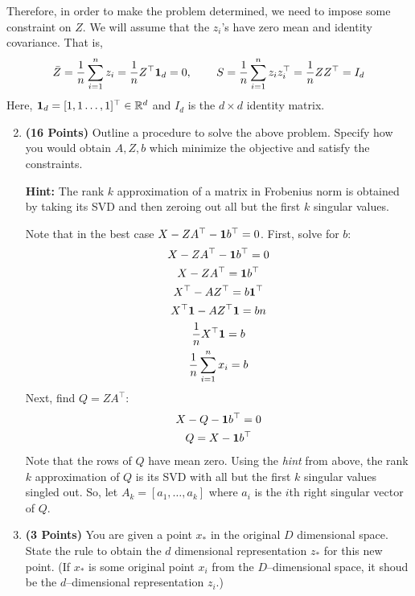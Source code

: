 Therefore, in order to make the problem determined, we need to impose some
constraint on $Z$. We will assume that the $z_i$'s have zero mean and identity covariance.
That is,
\begin{align*}
\bar{Z} = \frac{1}{n} \sum_{i=1}^n z_i =\frac{1}{n} Z^\top {\bf 1}_d = 0, \hspace{0.3in} 
S = \frac{1}{n} \sum_{i=1}^n z_i z_i^\top 
= \frac{1}{n} Z Z^\top
= I_d
\end{align*}
Here, ${\bf 1}_d = [1, 1 \dots, 1]^\top \in\mathbb{R}^d$ and $I_d$  is the $d\times d$ identity matrix.

\begin{enumerate}
\setcounter{enumi}{1}
\item \textbf{(16 Points)}
Outline a procedure to solve the above problem. Specify how you
would obtain $A, Z, b$ which minimize the objective and satisfy the constraints.

\textbf{Hint: }The rank $k$ approximation of a matrix in Frobenius norm is obtained by
taking its SVD and then zeroing out all but the first $k$ singular values.

\begin{soln}
  Note that in the best case $X - ZA^\top - {\bf 1} b^\top = 0$.
  First, solve for $b$:
  \begin{gather*}
    X - ZA^\top - {\bf 1} b^\top = 0 \\
    X - ZA^\top = {\bf 1} b^\top \\
    X^\top - AZ^\top = b {\bf 1}^\top \\
    X^\top {\bf 1} - AZ^\top {\bf 1} = b n \\
    \frac{1}{n} X^\top {\bf 1} = b \\
    \frac{1}{n} \sum_{i=1}^{n} x_i = b 
  \end{gather*}
  Next, find $Q=ZA^\top$:
  \begin{gather*}
    X - Q - {\bf 1} b^\top = 0 \\
    Q = X - {\bf 1} b^\top
  \end{gather*}
  Note that the rows of $Q$ have mean zero.
  Using the \textit{hint} from above, the rank $k$ approximation of $Q$ is its SVD with all but the first $k$ singular values singled out.
  So, let $A_k = [a_1, \dots, a_k]$ where $a_i$ is the $i$th right singular vector of $Q$.

\end{soln}

\item \textbf{(3 Points)}
You are given a point $x_*$ in the original $D$ dimensional space.
State the rule to obtain the $d$ dimensional
representation $z_*$ for this new point.
(If $x_*$ is some original point $x_i$ from the $D$--dimensional space, it shoud be the
$d$--dimensional representation $z_i$.)



\end{enumerate}


